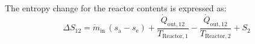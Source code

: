 The entropy change for the reactor contents is expressed as:  
\[
\Delta S_{12} = \dot{m}_{\text{in}} \, (s_{\text{a}} - s_{\text{e}}) + \frac{\dot{Q}_{\text{out},12}}{T_{\text{Reactor},1}} - \frac{\dot{Q}_{\text{out},12}}{T_{\text{Reactor},2}} + S_2
\]